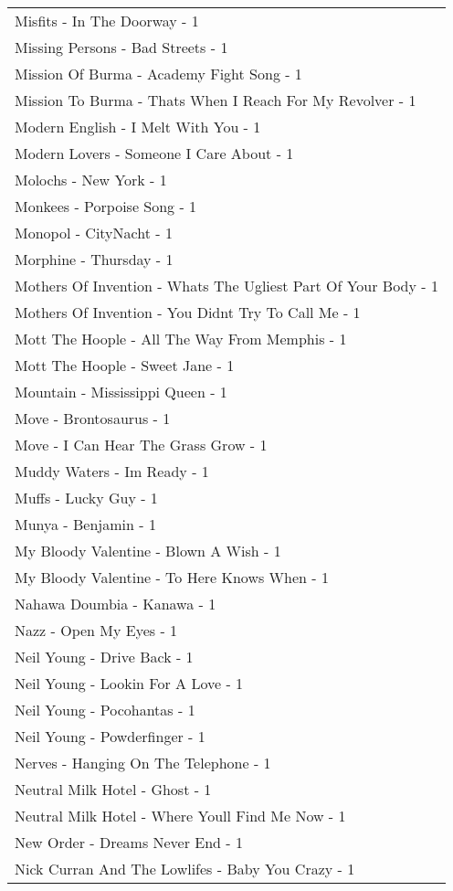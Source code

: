 \documentclass[
]{article}
\begin{document}
\begin{longtable}{l}
Misfits - In The Doorway - 1 \\ 
Missing Persons - Bad Streets - 1 \\ 
Mission Of Burma - Academy Fight Song - 1 \\ 
Mission To Burma - Thats When I Reach For My Revolver - 1 \\ 
Modern English - I Melt With You - 1 \\ 
Modern Lovers - Someone I Care About - 1 \\ 
Molochs - New York - 1 \\ 
Monkees - Porpoise Song - 1 \\ 
Monopol - CityNacht - 1 \\ 
Morphine - Thursday - 1 \\ 
Mothers Of Invention - Whats The Ugliest Part Of Your Body - 1 \\ 
Mothers Of Invention - You Didnt Try To Call Me - 1 \\ 
Mott The Hoople - All The Way From Memphis - 1 \\ 
Mott The Hoople - Sweet Jane - 1 \\ 
Mountain - Mississippi Queen - 1 \\ 
Move - Brontosaurus - 1 \\ 
Move - I Can Hear The Grass Grow - 1 \\ 
Muddy Waters - Im Ready - 1 \\ 
Muffs - Lucky Guy - 1 \\ 
Munya - Benjamin - 1 \\ 
My Bloody Valentine - Blown A Wish - 1 \\ 
My Bloody Valentine - To Here Knows When - 1 \\ 
Nahawa Doumbia - Kanawa - 1 \\ 
Nazz - Open My Eyes - 1 \\ 
Neil Young - Drive Back - 1 \\ 
Neil Young - Lookin For A Love - 1 \\ 
Neil Young - Pocohantas - 1 \\ 
Neil Young - Powderfinger - 1 \\ 
Nerves - Hanging On The Telephone - 1 \\ 
Neutral Milk Hotel - Ghost - 1 \\ 
Neutral Milk Hotel - Where Youll Find Me Now - 1 \\ 
New Order - Dreams Never End - 1 \\ 
Nick Curran And The Lowlifes - Baby You Crazy - 1 \\ 

\end{longtable}
\end{document}

